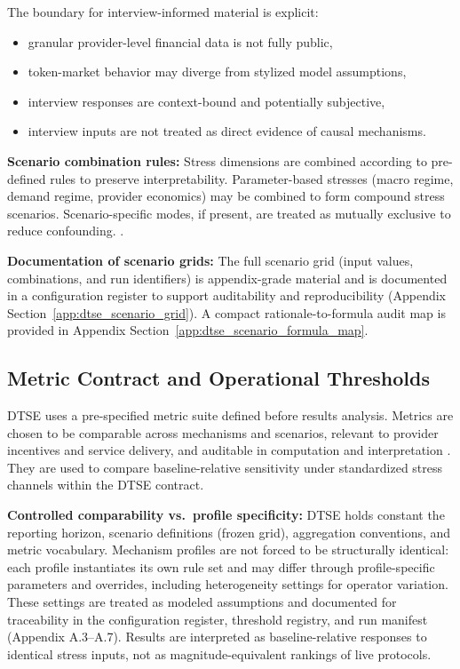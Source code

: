 The boundary for interview-informed material is explicit:
\begin{itemize}
    \item granular provider-level financial data is not fully public,
    \item token-market behavior may diverge from stylized model assumptions,
    \item interview responses are context-bound and potentially subjective,
    \item interview inputs are not treated as direct evidence of causal mechanisms.
\end{itemize}

\noindent\textbf{Scenario combination rules:}
Stress dimensions are combined according to pre-defined rules to preserve interpretability. Parameter-based stresses (macro regime, demand regime, provider economics) may be combined to form compound stress scenarios. Scenario-specific modes, if present, are treated as mutually exclusive to reduce confounding.
\cite{Morris2019, Braakman2022}.

\noindent\textbf{Documentation of scenario grids:}
The full scenario grid (input values, combinations, and run identifiers) is appendix-grade material and is documented in a configuration register to support auditability and reproducibility (Appendix Section~\ref{app:dtse_scenario_grid}). A compact rationale-to-formula audit map is provided in Appendix Section~\ref{app:dtse_scenario_formula_map}.

\subsection{Metric Contract and Operational Thresholds}
\label{sec:evaluation_metrics}
DTSE uses a pre-specified metric suite defined before results analysis. Metrics are chosen to be comparable across mechanisms and scenarios, relevant to provider incentives and service delivery, and auditable in computation and interpretation \cite{Morris2019}. They are used to compare baseline-relative sensitivity under standardized stress channels within the DTSE contract.

\noindent\textbf{Controlled comparability vs.\ profile specificity:}
DTSE holds constant the reporting horizon, scenario definitions (frozen grid), aggregation conventions, and metric vocabulary. Mechanism profiles are not forced to be structurally identical: each profile instantiates its own rule set and may differ through profile-specific parameters and overrides, including heterogeneity settings for operator variation. These settings are treated as modeled assumptions and documented for traceability in the configuration register, threshold registry, and run manifest (Appendix A.3--A.7). Results are interpreted as baseline-relative responses to identical stress inputs, not as magnitude-equivalent rankings of live protocols.

